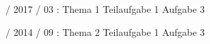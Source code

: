\documentclass{lehramt-informatik}
\begin{document}
%

 / 2017 / 03 : Thema 1 Teilaufgabe 1 Aufgabe 3

%

 / 2014 / 09 : Thema 2 Teilaufgabe 1 Aufgabe 3

\literatur
\end{document}
